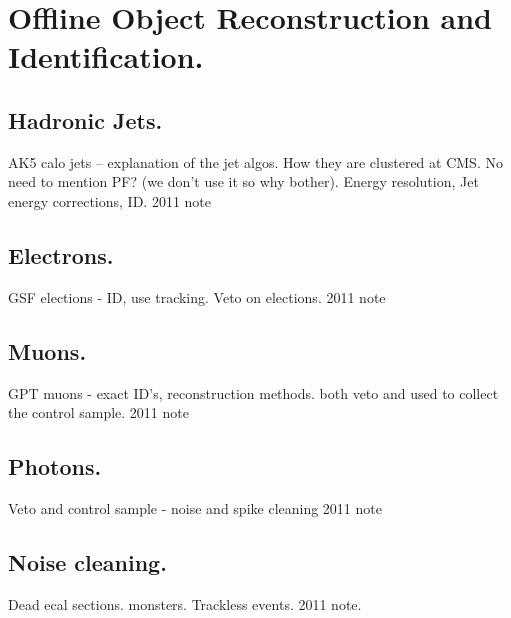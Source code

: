 \chapter{Offline Object Reconstruction and Identification.} %
\label{cha:offline_object_deffinitions}

\section{Hadronic Jets.} %
\label{sec:hadronic_jets}
AK5 calo jets -- explanation of the jet algos. How they are clustered at CMS.
No need to mention PF? (we don't use it so why bother). Energy resolution, Jet 
energy corrections, ID. 2011 note

\section{Electrons.} %
\label{sec:electrons}
GSF elections - ID, use tracking. Veto on elections. 2011 note

\section{Muons.} %
\label{sec:muons}
GPT muons - exact ID's, reconstruction methods. both veto and used to collect 
the control sample. 2011 note

\section{Photons.} %
\label{sec:photons}
Veto and control sample - noise and spike cleaning 2011 note

\section{Noise cleaning.} %
\label{sec:noise_cleaning}
Dead ecal sections.
monsters.
Trackless events.
2011 note.



